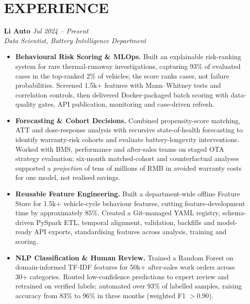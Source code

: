 \documentclass[a4paper,10pt]{article}
\begin{document}
\section{EXPERIENCE}
\textbf{Li Auto} \hfill \textit{Jul 2024 -- Present}\\
\textit{Data Scientist, Battery Intelligence Department}
\begin{itemize}
\item \textbf{Behavioural Risk Scoring \& MLOps.} Built an explainable risk-ranking system for rare thermal-runaway investigations, capturing 93\% of evaluated cases in the top-ranked 2\% of vehicles; the score ranks cases, not failure probabilities. Screened 1.5k+ features with Mann--Whitney tests and correlation controls, then delivered Docker-packaged batch scoring with data-quality gates, API publication, monitoring and case-driven refresh.
\item \textbf{Forecasting \& Cohort Decisions.} Combined propensity-score matching, ATT and dose-response analysis with recursive state-of-health forecasting to identify warranty-risk cohorts and evaluate battery-longevity interventions. Worked with BMS, performance and after-sales teams on staged OTA strategy evaluation; six-month matched-cohort and counterfactual analyses supported a \emph{projection} of tens of millions of RMB in avoided warranty costs for one model, not realised savings.
\item \textbf{Reusable Feature Engineering.} Built a department-wide offline Feature Store for 1.5k+ vehicle-cycle behaviour features, cutting feature-development time by approximately 85\%. Created a Git-managed YAML registry, schema-driven PySpark ETL, temporal alignment, validation, backfills and model-ready API exports, standardising features across analysis, training and scoring.
\item \textbf{NLP Classification \& Human Review.} Trained a Random Forest on domain-informed TF-IDF features for 50k+ after-sales work orders across 30+ categories. Routed low-confidence predictions to expert review and retrained on verified labels; automated over 93\% of labelled samples, raising accuracy from 83\% to 96\% in three months (weighted F1 $>0.90$).
\end{itemize}
\end{document}
